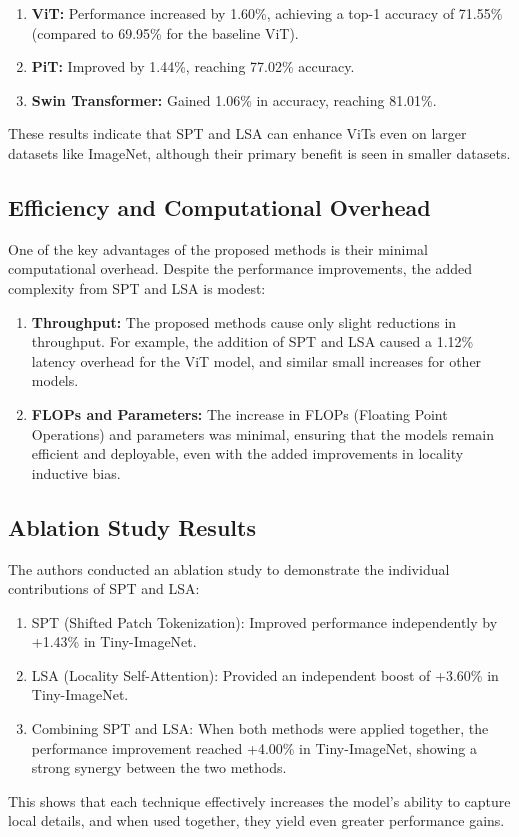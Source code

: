 \documentclass{report}
\begin{document}
	\begin{enumerate}
		\item 
		\textbf{ViT:} Performance increased by 1.60\%, achieving a top-1 accuracy of 71.55\% (compared to 69.95\% for the baseline ViT).
		
		\item 
		\textbf{PiT: }Improved by 1.44\%, reaching 77.02\% accuracy.
		
		\item 
		\textbf{Swin Transformer:} Gained 1.06\% in accuracy, reaching 81.01\%.
	\end{enumerate}
	These results indicate that SPT and LSA can enhance ViTs even on larger datasets like ImageNet, although their primary benefit is seen in smaller datasets.
	
	
	\subsection{Efficiency and Computational Overhead}
	One of the key advantages of the proposed methods is their minimal computational overhead. Despite the performance improvements, the added complexity from SPT and LSA is modest:
	
	\begin{enumerate}
		\item 
		\textbf{Throughput:} The proposed methods cause only slight reductions in throughput. For example, the addition of SPT and LSA caused a 1.12\% latency overhead for the ViT model, and similar small increases for other models.
		
		\item 
		\textbf{FLOPs and Parameters:} The increase in FLOPs (Floating Point Operations) and parameters was minimal, ensuring that the models remain efficient and deployable, even with the added improvements in locality inductive bias.
	\end{enumerate}
	
	
	\subsection{Ablation Study Results}
	The authors conducted an ablation study to demonstrate the individual contributions of SPT and LSA:
	
	\begin{enumerate}
		\item 
		SPT (Shifted Patch Tokenization): Improved performance independently by +1.43\% in Tiny-ImageNet.
		
		\item 
		LSA (Locality Self-Attention): Provided an independent boost of +3.60\% in Tiny-ImageNet.
		
		\item 
		Combining SPT and LSA: When both methods were applied together, the performance improvement reached +4.00\% in Tiny-ImageNet, showing a strong synergy between the two methods.
	\end{enumerate}
	This shows that each technique effectively increases the model's ability to capture local details, and when used together, they yield even greater performance gains.
	
\end{document}

